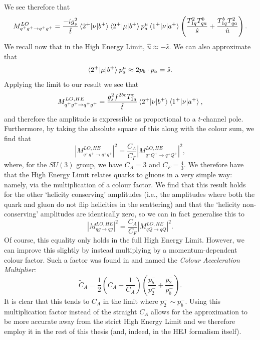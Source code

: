 We see therefore that
\begin{equation}
M_{q^+g^+ \to q^+g^+}^{LO} = \frac{-i g_s^2}{\hat{t}}\mathinner{\langle2^+\vert\nu\vert b^+\rangle}_{} \mathinner{\langle2^+\vert\mu\vert b^+\rangle}_{}p_a^\mu \mathinner{\langle1^+\vert\nu\vert a^+\rangle}_{}\left(\frac{T^2_{1q}T^b_{qa}}{\hat{s}} + \frac{T^b_{1q}T^2_{qa}}{\hat{u}} \right).
\end{equation}
We recall now that in the High Energy Limit, $\hat{u} \approx -\hat{s}$. We can also approximate that
\begin{equation}
\mathinner{\langle2^+\vert\mu\vert b^+\rangle}_{} p_a^\mu \approx 2 p_b \cdot p_a  = \hat{s}.
\end{equation}
Applying the limit to our result we see that 
\begin{equation}
M_{q^+g^+ \to q^+g^+}^{LO, HE} = \frac{g_s^2 f^{2bc}T^c_{1a}}{\hat{t}}\mathinner{\langle2^+\vert\nu\vert b^+\rangle}_{} \mathinner{\langle1^+\vert\nu\vert a^+\rangle}_{},
\end{equation}
and therefore the amplitude is expressible as proportional to a $t$-channel pole. Furthermore, by taking the absolute square of this along with the colour sum, we find that
\begin{equation}
|M_{q^+g^+ \to q^+g^+}^{LO, HE}|^2 = \frac{C_A}{C_F} |M_{q^+Q^+ \to q^+Q^+}^{LO, HE}|^2,
\end{equation}
where, for the $SU(3)$ group, we have $C_A = 3$ and $C_F = \frac{4}{3}$. We therefore have that the High Energy Limit relates quarks to gluons in a very simple way: namely, via the multiplication of a colour factor. We find that this result holds for the other `helicity conserving' amplitudes (i.e., the amplitudes where both the quark and gluon do not flip helicities in the scattering) and that the `helicity non-conserving' amplitudes are identically zero, so we can in fact generalise this to
\begin{equation}
|M_{qg \to qg}^{LO, HE}|^2 = \frac{C_A}{C_F} |M_{qQ \to qQ}^{LO, HE}|^2.
\end{equation}
Of course, this equality only holds in the full High Energy Limit. However, we can improve this slightly by instead multiplying by a momentum-dependent colour factor. Such a factor was found in \cite{Andersen2010} and named the \emph{Colour Acceleration Multiplier}:
\begin{equation}
\tilde{C}_A = \frac{1}{2} \left(C_A - \frac{1}{C_A} \right) \left(\frac{p_b^-}{p_2^-} + \frac{p_2^-}{p_b^-} \right).
\label{eqn:CAM}
\end{equation}
It is clear that this tends to $C_A$ in the limit where $p_2^- \sim p_b^-$. Using this multiplication factor instead of the straight $C_A$ allows for the approximation to be more accurate away from the strict High Energy Limit and we therefore employ it in the rest of this thesis (and, indeed, in the HEJ formalism itself). 

